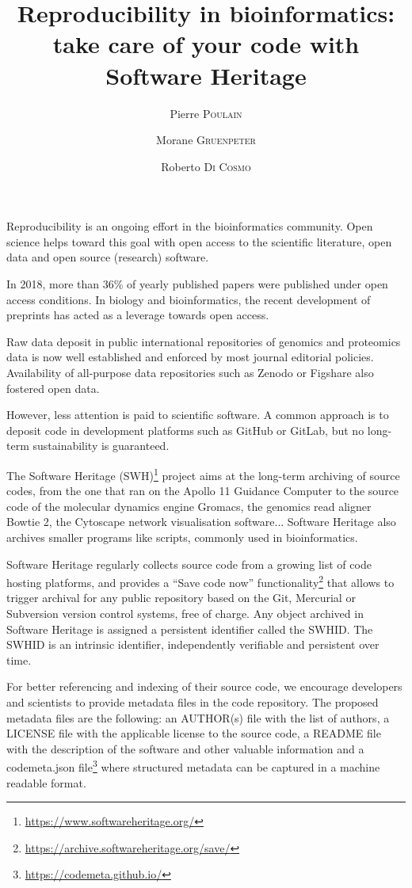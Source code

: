 \documentclass[poster, final]{jobim}
\title{Reproducibility in bioinformatics: take care of your code with Software Heritage}
\author{Pierre \textsc{Poulain}\inst{1} \and Morane \textsc{Gruenpeter}\inst{2} \and Roberto \textsc{Di Cosmo}\inst{3}}
\institute{
	Université de Paris, CNRS, Institut Jacques Monod, F-75006, Paris, France
	\and
	Software Heritage, Inria, France
	\and
	Software Heritage, Inria and University of Paris, France
}
\begin{document}

\maketitle

\setcounter{footnote}{0}

Reproducibility is an ongoing effort in the bioinformatics community\cite{kim2018}. Open science helps toward this goal with open access to the scientific literature, open data and
open source (research) software.

In 2018, more than 36\% of yearly published papers were published under open access conditions\cite{trendsopenaccesspublications}. In biology and bioinformatics, the recent development of preprints has acted as a leverage towards open access.

Raw data deposit in public international repositories of genomics and proteomics data is now well established and enforced by most journal editorial policies. Availability of all-purpose data repositories such as Zenodo or Figshare also fostered open data.

However, less attention is paid to scientific software. A common approach is to deposit code in development platforms such as GitHub or GitLab, but no long-term
sustainability is guaranteed.

The Software Heritage (SWH)\footnote{\url{https://www.softwareheritage.org/}} project\cite{dicosmo2017} aims at the long-term archiving of source codes, from the one that ran on the Apollo 11 Guidance Computer to the source code of the molecular dynamics engine Gromacs, the genomics read aligner Bowtie 2, the Cytoscape network visualisation software... Software Heritage also archives smaller programs like scripts, commonly used in bioinformatics.

Software Heritage regularly collects source code from a growing list of code
hosting platforms, and provides a “Save code now” functionality\footnote{\url{https://archive.softwareheritage.org/save/}} that allows to trigger archival for any
public repository based on the Git, Mercurial or Subversion version control systems, free of charge. Any object archived in Software Heritage is assigned a persistent identifier called the SWHID\cite{dicosmo2020}.
The SWHID is an intrinsic identifier, independently verifiable and persistent over time.

For better referencing and indexing of their source code, we encourage developers and scientists to provide metadata files in the code repository. The proposed metadata files are the following: an AUTHOR(s) file with the list of authors, a LICENSE file with the applicable license to the source code, a README file with the description of the software and other valuable information and a codemeta.json file\footnote{\url{https://codemeta.github.io/}} where structured metadata can be captured in a machine readable format.


\printbibliography
 
\end{document}
